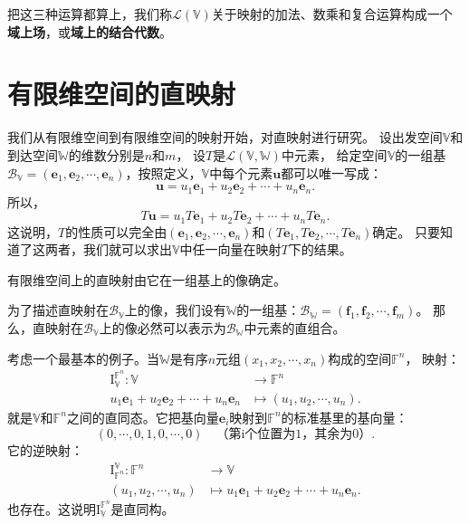 \documentclass[12pt,UTF8]{ctexbook}
\begin{document}
把这三种运算都算上，我们称$\mathcal{L}(\mathbb{V})$关于映射的加法、数乘和复合运算构成一个\textbf{域上场}，或\textbf{域上的结合代数}。

\section{有限维空间的直映射}
我们从有限维空间到有限维空间的映射开始，对直映射进行研究。
设出发空间$\mathbb{V}$和到达空间$\mathbb{W}$的维数分别是$n$和$m$，
设$T$是$\mathcal{L}(\mathbb{V}, \mathbb{W})$中元素，
给定空间$\mathbb{V}$的一组基$\mathcal{B}_{\mathbb{V}} = (\mathbf{e}_1,\mathbf{e}_2,\cdots,\mathbf{e}_n)$，按照定义，$\mathbb{V}$中每个元素$\mathbf{u}$都可以唯一写成：
$$ \mathbf{u} = u_1\mathbf{e}_1+u_2\mathbf{e}_2+\cdots+u_n\mathbf{e}_n.$$
所以，
$$T\mathbf{u} = u_1T\mathbf{e}_1+u_2T\mathbf{e}_2+\cdots+u_nT\mathbf{e}_n.$$
这说明，$T$的性质可以完全由$(\mathbf{e}_1,\mathbf{e}_2,\cdots,\mathbf{e}_n)$和$(T\mathbf{e}_1,T\mathbf{e}_2,\cdots,T\mathbf{e}_n)$确定。
只要知道了这两者，我们就可以求出$\mathbb{V}$中任一向量在映射$T$下的结果。

\begin{pp}\label{pp:3_0}
    有限维空间上的直映射由它在一组基上的像确定。
\end{pp}

为了描述直映射在$\mathcal{B}_{\mathbb{V}}$上的像，我们设有$\mathbb{W}$的一组基：$\mathcal{B}_{\mathbb{W}} = (\mathbf{f}_1,\mathbf{f}_2,\cdots,\mathbf{f}_m)$。
那么，直映射在$\mathcal{B}_{\mathbb{V}}$上的像必然可以表示为$\mathcal{B}_{\mathbb{W}}$中元素的直组合。

考虑一个最基本的例子。当$\mathbb{W}$是有序$n$元组$(x_1, x_2, \cdots, x_n)$构成的空间$\mathbb{F}^n$，
映射：
\begin{align*}
    \mathrm{I}_{\mathbb{V}}^{\mathbb{F}^n} : \mathbb{V} &\rightarrow \mathbb{F}^n  \\
    u_1\mathbf{e}_1+u_2\mathbf{e}_2+\cdots+u_n\mathbf{e}_n &\mapsto (u_1, u_2, \cdots , u_n). 
\end{align*}
就是$\mathbb{V}$和$\mathbb{F}^n$之间的直同态。它把基向量$\mathbf{e}_i$映射到$\mathbb{F}^n$的标准基里的基向量：
$$ (0, \cdots, 0, 1, 0, \cdots, 0)\quad\mbox{（第i个位置为1，其余为0）}.$$
它的逆映射：
\begin{align*}
    \mathrm{I}_{\mathbb{F}^n}^{\mathbb{V}} : \mathbb{F}^n &\rightarrow \mathbb{V}  \\
    (u_1, u_2, \cdots , u_n) &\mapsto u_1\mathbf{e}_1+u_2\mathbf{e}_2+\cdots+u_n\mathbf{e}_n. 
\end{align*}
也存在。这说明$\mathrm{I}_{\mathbb{V}}^{\mathbb{F}^n}$是直同构。
\end{document}
